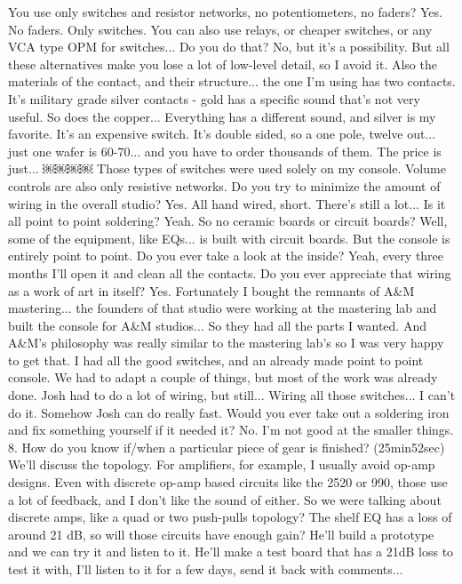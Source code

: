 You use only switches and resistor networks, no potentiometers, no faders?
Yes. No faders. Only switches. You can also use relays, or cheaper switches, or any VCA type OPM for switches...
Do you do that?
No, but it's a possibility. But all these alternatives make you lose a lot of low-level detail, so I avoid it. Also the materials of the contact, and their structure... the one I'm using has two contacts. It's military grade silver contacts - gold has a specific sound that's not very useful. So does the copper... Everything has a different sound, and silver is my favorite. It's an expensive switch. It's double sided, so a one pole, twelve out... just one wafer is 60-70... and you have to order thousands of them. The price is just...
￼￼￼￼
Those types of switches were used solely on my console. Volume controls are also only resistive networks.
Do you try to minimize the amount of wiring in the overall studio?
Yes. All hand wired, short. There's still a lot...
Is it all point to point soldering?
Yeah.
So no ceramic boards or circuit boards?
Well, some of the equipment, like EQs... is built with circuit boards. But the console is entirely point to point.
Do you ever take a look at the inside?
Yeah, every three months I'll open it and clean all the contacts.
Do you ever appreciate that wiring as a work of art in itself?
Yes. Fortunately I bought the remnants of A\&M mastering... the founders of that studio were working at the mastering lab and built the console for A\&M studios... So they had all the parts I wanted. And A\&M's philosophy was really similar to the mastering lab's so I was very happy to get that. I had all the good switches, and an already made point to point console. We had to adapt a couple of things, but most of the work was already done. Josh had to do a lot of wiring, but still...
Wiring all those switches... I can't do it. Somehow Josh can do really fast.
Would you ever take out a soldering iron and fix something yourself if it needed it?
No. I'm not good at the smaller things.
8. How do you know if/when a particular piece of gear is finished? (25min52sec)
We'll discuss the topology. For amplifiers, for example, I usually avoid op-amp designs. Even with discrete op-amp based circuits like the 2520 or 990, those use a lot of feedback, and I don't like the sound of either. So we were talking about discrete amps, like a quad or two push-pulls topology? The shelf EQ has a loss of around 21 dB, so will those circuits have enough gain? He'll build a prototype and we can try it and listen to it. He'll make a test board that has a 21dB loss to test it with, I'll listen to it for a few days, send it back with comments...
